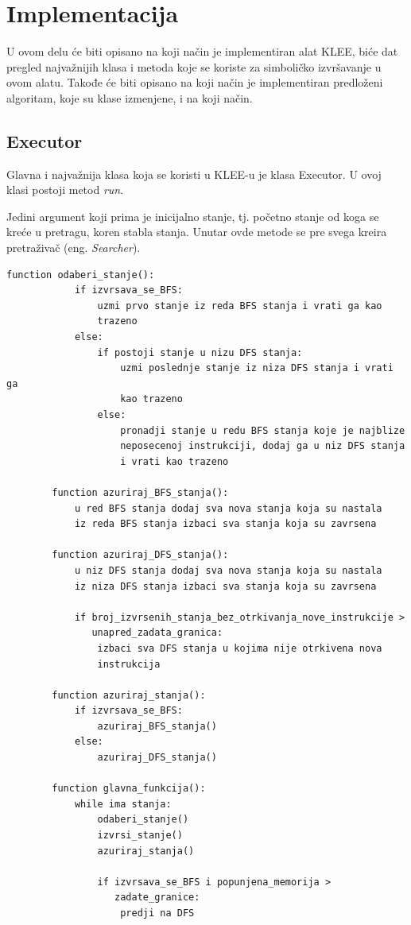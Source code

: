 \documentclass[12pt,oneside]{memoir}
\begin{document}
\section{Implementacija}
U ovom delu će biti opisano na koji način je implementiran alat KLEE, biće dat pregled najvažnijih klasa i metoda koje se koriste za simboličko izvršavanje u ovom alatu. Takođe će biti opisano na koji način je implementiran predloženi algoritam, koje su klase izmenjene, i na koji način.

\subsection{Executor}
Glavna i najvažnija klasa koja se koristi u KLEE-u je klasa Executor. U ovoj klasi postoji metod \textit{run}. 

Jedini argument koji prima je inicijalno stanje, tj. početno stanje od koga se kreće u pretragu, koren stabla stanja. Unutar ovde metode se pre svega kreira pretraživač (eng. \textit{Searcher}). 
\newpage
\begin{lstlisting}[caption={Pseudokod predloženog algoritma},captionpos=b,label={lst:pseudo_kod}]
        function odaberi_stanje():
            if izvrsava_se_BFS:
                uzmi prvo stanje iz reda BFS stanja i vrati ga kao 
                trazeno
            else:
                if postoji stanje u nizu DFS stanja:
                    uzmi poslednje stanje iz niza DFS stanja i vrati ga 
                    kao trazeno
                else:
                    pronadji stanje u redu BFS stanja koje je najblize 
                    neposecenoj instrukciji, dodaj ga u niz DFS stanja
                    i vrati kao trazeno
        
        function azuriraj_BFS_stanja():
            u red BFS stanja dodaj sva nova stanja koja su nastala
            iz reda BFS stanja izbaci sva stanja koja su zavrsena
        
        function azuriraj_DFS_stanja():
            u niz DFS stanja dodaj sva nova stanja koja su nastala
            iz niza DFS stanja izbaci sva stanja koja su zavrsena
            
            if broj_izvrsenih_stanja_bez_otrkivanja_nove_instrukcije > 
               unapred_zadata_granica:
                izbaci sva DFS stanja u kojima nije otrkivena nova 
                instrukcija
        
        function azuriraj_stanja():
            if izvrsava_se_BFS:
                azuriraj_BFS_stanja()
            else:
                azuriraj_DFS_stanja()
        
        function glavna_funkcija():
            while ima stanja:
                odaberi_stanje()
                izvrsi_stanje()
                azuriraj_stanja()
            
                if izvrsava_se_BFS i popunjena_memorija > 
                   zadate_granice:
                    predji na DFS

    \end{lstlisting}
\end{document}
